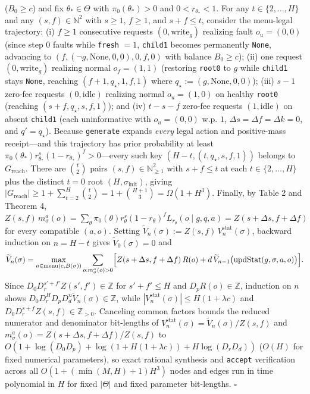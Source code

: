 \documentclass[11pt,a4paper]{article}
\begin{document}
(\(B_0 \ge c\)) and fix \(\theta_* \in \Theta\) with
\(\pi_0(\theta_*) > 0\) and \(0 < r_{\theta_*} < 1\). For any
\(t \in \{2, \dots, H\}\) and any \((s, f) \in \mathbb{N}^2\) with
\(s \ge 1\), \(f \ge 1\), and \(s + f \le t\), consider the menu-legal
trajectory: (i) \(f \ge 1\) consecutive requests
\((0, \mathrm{write}_g)\) realizing fault \(o_u = (0,0)\) (since step
\(0\) faults while \texttt{fresh} \(= 1\), \texttt{child1} becomes
permanently \texttt{None}, advancing to
\((f, (\neg g, \mathrm{None}, 0, 0), 0, f, 0)\) with balance
\(B_0 \ge c\)); (ii) one request \((0, \mathrm{write}_g)\) realizing
normal \(o_f = (1,1)\) (restoring \texttt{root0} to \(g\) while
\texttt{child1} stays \texttt{None}, reaching
\((f+1, q_\star, 1, f, 1)\) where
\(q_\star := (g, \mathrm{None}, 0, 0)\)); (iii) \(s - 1\) zero-fee
requests \((0, \mathrm{idle})\) realizing normal \(o_u = (1,0)\) on
healthy \texttt{root0} (reaching \((s+f, q_\star, s, f, 1)\)); and (iv)
\(t - s - f\) zero-fee requests \((1, \mathrm{idle})\) on absent
\texttt{child1} (each uninformative with \(o_u = (0,0)\) w.p. \(1\),
\(\Delta s = \Delta f = \Delta k = 0\), and \(q' = q_\star\)). Because
\texttt{generate} expands \emph{every} legal action and positive-mass
receipt---and this trajectory has prior probability at least
\(\pi_0(\theta_*) r_{\theta_*}^s (1 - r_{\theta_*})^f > 0\)---every such
key \((H - t, (t, q_\star, s, f, 1))\) belongs to
\(G_{\mathrm{reach}}\). There are \(\binom{t}{2}\) pairs
\((s, f) \in \mathbb{N}_{\ge 1}^2\) with \(s + f \le t\) at each
\(t \in \{2, \dots, H\}\) plus the distinct \(t = 0\) root
\((H, \sigma_{\mathrm{init}})\), giving
\(|G_{\mathrm{reach}}| \ge 1 + \sum_{t=2}^H \binom{t}{2} = 1 + \binom{H+1}{3} = \Omega(1 + H^3)\).
Finally, by Table 2 and Theorem 4,
\(Z(s,f)\,m_\sigma^a(o) = \sum_\theta \pi_0(\theta) r_\theta^s(1 - r_\theta)^f L_{r_\theta}(o \mid g, q, a) = Z(s + \Delta s, f + \Delta f)\)
for every compatible \((a, o)\). Setting
\(\widetilde{V}_n(\sigma) := Z(s,f)\,V_n^{\mathrm{stat}}(\sigma)\),
backward induction on \(n = H - t\) gives
\(\widetilde{V}_0(\sigma) = 0\) and
\[\widetilde{V}_n(\sigma) = \max_{a \in \mathrm{menu}(c, B(\sigma))} \sum_{o : m_\sigma^a(o) > 0} \Bigl[Z(s + \Delta s, f + \Delta f)\,R(o) + d\,\widetilde{V}_{n-1}\bigl(\mathrm{updStat}(g, \sigma, a, o)\bigr)\Bigr].\]
Since \(D_0 D_r^{s' + f'} Z(s', f') \in \mathbb{Z}\) for
\(s' + f' \le H\) and \(D_p R(o) \in \mathbb{Z}\), induction on \(n\)
shows \(D_0 D_r^H D_p D_d^n \widetilde{V}_n(\sigma) \in \mathbb{Z}\),
while \(|V_n^{\mathrm{stat}}(\sigma)| \le H(1 + \lambda c)\) and
\(D_0 D_r^{s+f} Z(s,f) \in \mathbb{Z}_{>0}\). Canceling common factors
bounds the reduced numerator and denominator bit-lengths of
\(V_n^{\mathrm{stat}}(\sigma) = \widetilde{V}_n(\sigma)/Z(s,f)\) and
\(m_\sigma^a(o) = Z(s+\Delta s, f+\Delta f)/Z(s,f)\) to
\(O(1 + \log(D_0 D_p) + \log(1 + H(1 + \lambda c)) + H\log(D_r D_d))\)
(\(O(H)\) for fixed numerical parameters), so exact rational synthesis
and \texttt{accept} verification across all
\(O(1 + (\min(M, H) + 1)H^3)\) nodes and edges run in time polynomial in
\(H\) for fixed \(|\Theta|\) and fixed parameter bit-lengths.
\(\square\)
\end{document}
